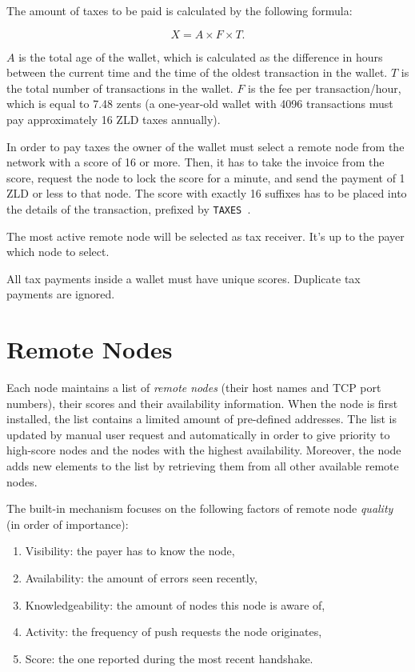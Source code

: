 \documentclass[11pt,oneside]{article}
\newcommand\dd[1]{\colorbox{gray!30}{\texttt{#1}}}
\begin{document}
The amount of taxes to be paid is calculated by the following formula:

$$X = A \times F \times T.$$

$A$ is the total age of the wallet,
which is calculated as the difference in hours between the current time
and the time of the oldest transaction in the wallet.
$T$ is the total number of transactions in the wallet.
$F$ is the fee per transaction/hour, which is equal to 7.48 zents
(a one-year-old wallet with 4096 transactions must pay approximately 16 ZLD taxes annually).

In order to pay taxes the owner of the wallet must select a remote
node from the network with a score of 16 or more. Then, it has to
take the invoice from the score, request the node to lock the score
for a minute, and send the payment of 1 ZLD or less
to that node. The score with exactly 16 suffixes
has to be placed into the details of the transaction,
prefixed by \dd{TAXES }.

The most active remote node will be selected as tax receiver.
It's up to the payer which node to select.

All tax payments inside a wallet must have unique scores.
Duplicate tax payments are ignored.

\section{Remote Nodes}\label{sec:remotes}

Each node maintains a list of \emph{remote nodes} (their host names and TCP port numbers),
their scores and their availability information. When the node is first installed,
the list contains a limited amount of pre-defined addresses. The list is
updated by manual user request and automatically in order to give priority
to high-score nodes and the nodes with the highest availability.
Moreover, the node adds new elements to the list by retrieving them from all other
available remote nodes.

The built-in mechanism focuses on the following factors of
remote node \emph{quality} (in order of importance):

\begin{enumerate}
  \item Visibility: the payer has to know the node,
  \item Availability: the amount of errors seen recently,
  \item Knowledgeability: the amount of nodes this node is aware of,
  \item Activity: the frequency of push requests the node originates,
  \item Score: the one reported during the most recent handshake.
\end{enumerate}
\end{document}
